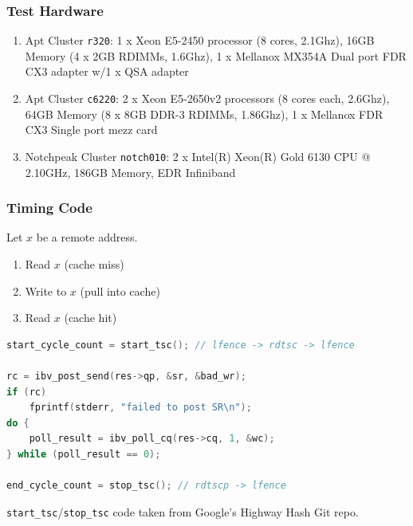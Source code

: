 \documentclass{beamer}
\begin{document}
\begin{frame}
 \frametitle{Test Hardware}
 \begin{enumerate}
  \item Apt Cluster \texttt{r320}: 1 x Xeon E5-2450 processor (8 cores, 2.1Ghz), 16GB Memory (4 x 2GB RDIMMs, 1.6Ghz), 1 x Mellanox MX354A Dual port FDR CX3 adapter w/1 x QSA adapter
  \item Apt Cluster \texttt{c6220}: 2 x Xeon E5-2650v2 processors (8 cores each, 2.6Ghz), 64GB Memory (8 x 8GB DDR-3 RDIMMs, 1.86Ghz), 1 x Mellanox FDR CX3 Single port mezz card
  \item Notchpeak Cluster \texttt{notch010}: 2 x Intel(R) Xeon(R) Gold 6130 CPU @ 2.10GHz, 186GB Memory, EDR Infiniband
 \end{enumerate}

\end{frame}

\begin{frame}[fragile]
 \frametitle{Timing Code}
 Let $x$ be a remote address.
 \begin{enumerate}
  \item Read $x$ (cache miss)
  \item Write to $x$ (pull into cache)
  \item Read $x$ (cache hit)
 \end{enumerate}

 \begin{lstlisting}[frame=single,language=C,basicstyle=\tiny]
start_cycle_count = start_tsc(); // lfence -> rdtsc -> lfence

rc = ibv_post_send(res->qp, &sr, &bad_wr);
if (rc)
    fprintf(stderr, "failed to post SR\n");
do {
    poll_result = ibv_poll_cq(res->cq, 1, &wc);
} while (poll_result == 0);

end_cycle_count = stop_tsc(); // rdtscp -> lfence
\end{lstlisting}
 \footnotesize
 \texttt{start\_tsc}/\texttt{stop\_tsc} code taken from Google's Highway Hash Git repo.
\end{frame}
\end{document}
